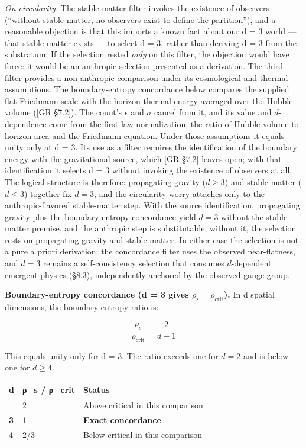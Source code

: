 \documentclass[
]{article}
\begin{document}
\emph{On circularity.} The stable-matter filter invokes the existence of
observers (``without stable matter, no observers exist to define the
partition''), and a reasonable objection is that this imports a known
fact about our d = 3 world --- that stable matter exists --- to select d
= 3, rather than deriving d = 3 from the substratum. If the selection
rested \emph{only} on this filter, the objection would have force: it
would be an anthropic selection presented as a derivation. The third
filter provides a non-anthropic comparison under its cosmological and
thermal assumptions. The boundary-entropy concordance below compares the
supplied flat Friedmann scale with the horizon thermal energy averaged
over the Hubble volume ({[}GR §7.2{]}). The count's \(\epsilon\) and
\(\sigma\) cancel from it, and its value and \(d\)-dependence come from
the first-law normalization, the ratio of Hubble volume to horizon area
and the Friedmann equation. Under those assumptions it equals unity only
at d = 3. Its use as a filter requires the identification of the
boundary energy with the gravitational source, which {[}GR §7.2{]}
leaves open; with that identification it selects d = 3 without invoking
the existence of observers at all. The logical structure is therefore:
propagating gravity (\(d \geq 3\)) and stable matter (\(d \leq 3\))
together fix \(d = 3\), and the circularity worry attaches only to the
anthropic-flavored stable-matter step. With the source identification,
propagating gravity plus the boundary-entropy concordance yield
\(d = 3\) without the stable-matter premise, and the anthropic step is
substitutable; without it, the selection rests on propagating gravity
and stable matter. In either case the selection is not a pure a priori
derivation: the concordance filter uses the observed near-flatness, and
\(d = 3\) remains a self-consistency selection that consumes
\(d\)-dependent emergent physics (§8.3), independently anchored by the
observed gauge group.

\textbf{Boundary-entropy concordance (d = 3 gives
\(\rho_s = \rho_{\text{crit}}\)).} In d spatial dimensions, the boundary
entropy ratio is:

\[\frac{\rho_s}{\rho_{\text{crit}}} = \frac{2}{d-1}\]

This equals unity only for d = 3. The ratio exceeds one for \(d=2\) and
is below one for \(d\geq 4\).

\begin{longtable}[]{@{}lll@{}}
\toprule\noalign{}
d & ρ\_s / ρ\_crit & Status \\
\midrule\noalign{}
\endhead
\bottomrule\noalign{}
\endlastfoot
2 & 2 & Above critical in this comparison \\
\textbf{3} & \textbf{1} & \textbf{Exact concordance} \\
4 & 2/3 & Below critical in this comparison \\
\end{longtable}
\end{document}
